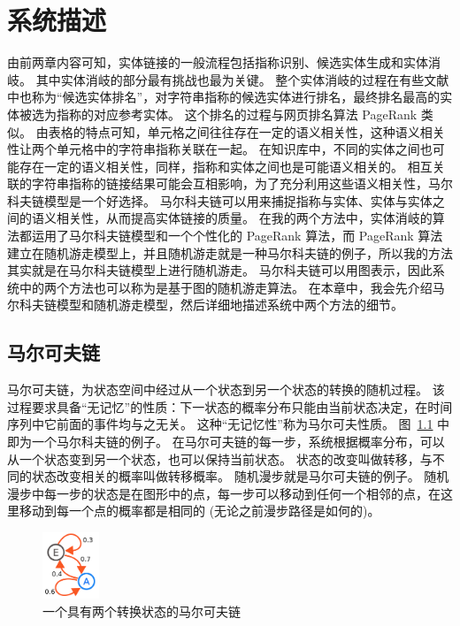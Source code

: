 \chapter{系统描述}

由前两章内容可知，实体链接的一般流程包括指称识别、候选实体生成和实体消岐。
其中实体消岐的部分最有挑战也最为关键。
整个实体消岐的过程在有些文献\cite{shen2015entity}中也称为``候选实体排名''，对字符串指称的候选实体进行排名，最终排名最高的实体被选为指称的对应参考实体。
这个排名的过程与网页排名算法 PageRank\cite{page1999pagerank} 类似。
由表格的特点可知，单元格之间往往存在一定的语义相关性，这种语义相关性让两个单元格中的字符串指称关联在一起。
在知识库中，不同的实体之间也可能存在一定的语义相关性，同样，指称和实体之间也是可能语义相关的。
相互关联的字符串指称的链接结果可能会互相影响，为了充分利用这些语义相关性，马尔科夫链模型\cite{stewart1994introduction}是一个好选择。
马尔科夫链可以用来捕捉指称与实体、实体与实体之间的语义相关性，从而提高实体链接的质量。
在我的两个方法中，实体消岐的算法都运用了马尔科夫链模型和一个个性化的 PageRank 算法\cite{haveliwala2003topic}\cite{langville2011google}，而 PageRank 算法建立在随机游走模型上\cite{haveliwala2003topic}，并且随机游走就是一种马尔科夫链的例子，所以我的方法其实就是在马尔科夫链模型上进行随机游走。
马尔科夫链可以用图表示，因此系统中的两个方法也可以称为是基于图的随机游走算法。
在本章中，我会先介绍马尔科夫链模型和随机游走模型，然后详细地描述系统中两个方法的细节。


\section{马尔可夫链}
马尔可夫链，为状态空间中经过从一个状态到另一个状态的转换的随机过程。
该过程要求具备``无记忆''的性质：下一状态的概率分布只能由当前状态决定，在时间序列中它前面的事件均与之无关。
这种``无记忆性''称为马尔可夫性质。
图~\ref{markov_chain} 中即为一个马尔科夫链的例子。
在马尔可夫链的每一步，系统根据概率分布，可以从一个状态变到另一个状态，也可以保持当前状态。
状态的改变叫做转移，与不同的状态改变相关的概率叫做转移概率。
随机漫步就是马尔可夫链的例子。
随机漫步中每一步的状态是在图形中的点，每一步可以移动到任何一个相邻的点，在这里移动到每一个点的概率都是相同的 (无论之前漫步路径是如何的)。\par

\begin{figure}[htbp]
\centering
\includegraphics[width=0.15\textwidth]{img/markov_chain}
\caption{一个具有两个转换状态的马尔可夫链}
\label{markov_chain}
\end{figure}

